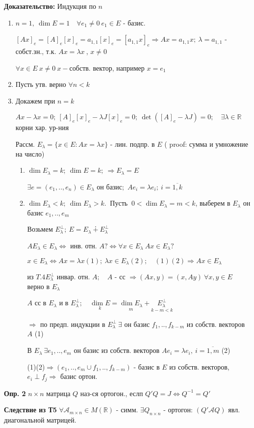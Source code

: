 \textbf{Доказательство: } Индукция по $n$
\begin{enumerate}
 \item $n = 1,\ \dim E = 1\quad \forall e_1 \ne 0\ e_1 \in E$ - базис.

    $[Ax]_e = [A]_e [x]_e = a_{1,1}[x]_e = [a_{1,1}x]_e \Rightarrow Ax = a_{1,1}x;\ \lambda = a_{1,1}$ - собст.зн., т.к. $Ax = \lambda x\ $, $x\ne 0$

    $\forall x \in E\ x\ne 0\ x-$собств. вектор, например $x=e_1$

 \item Пусть утв. верно $\forall n < k$
 \item Докажем при $n=k$

    $Ax - \lambda x = 0;\ [A]_e [x]_e - \lambda J[x]_e = 0;\ \det([A]_e - \lambda J) = 0;\quad \exists \lambda \in \mathbb{R}$ корни хар. ур-ния
    
    Рассм. $E_\lambda = \{ x\in E : Ax = \lambda x\}$ - лин. подпр. в $E$ ( proof: сумма и умножение на число)
    
    \begin{enumerate}
     \item $\dim E_\lambda = k;\ \dim E = k;\ \Rightarrow E_\lambda = E$
      
	$\exists e=(e_1,..,e_n) \in E_\lambda$ он базис;\ $Ae_i = \lambda e_i;\ i = \overline{1,k}$

     \item $\dim E_\lambda < k; \ \dim E_\lambda > k.\ $ Пусть $\ 0 < \dim E_\lambda = m < k$, выберем в $E_\lambda$ он базис $e_1,..,e_m$

	Возьмем $E^\perp_\lambda;\ E = E_\lambda \dotplus E_\lambda^\perp$

	$AE_\lambda \in E_\lambda \Leftrightarrow$ инв. отн. $A ? \Leftrightarrow \forall x \in E_\lambda\ Ax \in E_\lambda ?$

	$x \in E_\lambda \Leftrightarrow Ax = \lambda x (1);\ \lambda x \in E_\lambda (2);\quad (1)(2)\Rightarrow Ax \in E_\lambda$

	из $T.4 E_\lambda^\perp$ инвар. отн. $A;\quad A$ - сс $\Rightarrow (Ax,y) = (x,Ay)\ \forall x,y \in E$ верно в $E_\lambda$

	$A$ сс в $E_\lambda$ и в $E_\lambda^\perp;\quad \underset{k}{\dim E} = \underset{m}{\dim E_\lambda} + \underset{k-m < k}{E_\lambda^\perp}$

	$\Rightarrow$ по предп. индукции в $E_\lambda^\perp\ \exists$ он базис $f_1,..,f_{k-m}$ из собств. векторов $A$ (1)

	В $E_\lambda\ \exists e_1,..,e_m$ он базис из собств. векторов $Ae_i = \lambda e_i,\ i=\overline{1,m} $ (2)
    
	(1)(2)$\Rightarrow (e_1,..,e_m \cup f_1,..,f_{k-m})$ - базис в $E$ из собств. векторов, $e_i \perp f_j \Rightarrow$ базис ортон.
    \end{enumerate}

\end{enumerate}


\textbf{Опр. 2} $n\times n$ матрица $Q$ наз-ся ортогон., еслп $Q'Q = J \Leftrightarrow Q^{-1} = Q'$

\textbf{Следствие из Т5} $\forall \mathcal{A}_{m\times n} \in M(\mathbb{R})$ - симм. $\exists Q_{n\times n}$ - ортогон: $(Q'\mathcal{A}Q)$ явл. диагональной матрицей.